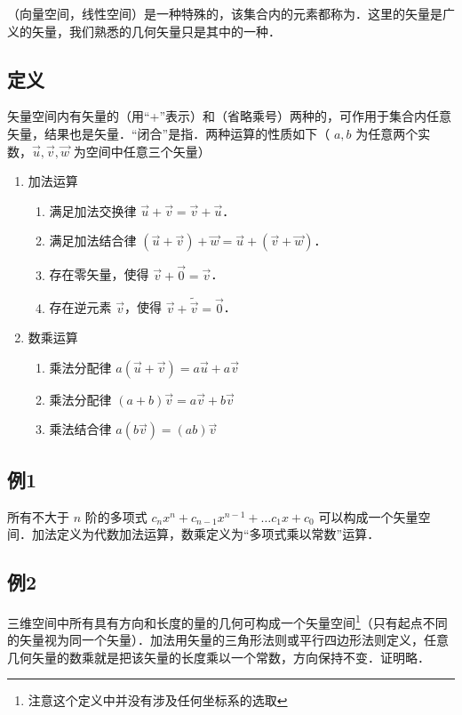 
（向量空间，线性空间）是一种特殊的，该集合内的元素都称为．这里的矢量是广义的矢量，我们熟悉的几何矢量只是其中的一种．

\subsection{定义}
矢量空间内有矢量的（用“+”表示）和（省略乘号）两种的，可作用于集合内任意矢量，结果也是矢量．“闭合”是指．两种运算的性质如下（ $a,b$ 为任意两个实数，$\vec u,\vec v,\vec w$ 为空间中任意三个矢量）
\begin{enumerate}
\item 加法运算
\begin{enumerate}
\item 满足加法交换律 $\vec u + \vec v = \vec v + \vec u$．
\item 满足加法结合律 $(\vec u + \vec v) + \vec w = \vec u + (\vec v + \vec w)$．
\item 存在零矢量，使得 $\vec v + \vec 0 = \vec v$．
\item 存在逆元素 $\vec v$，使得 $\vec v + \tilde{\vec v} = \vec 0$．
\end{enumerate}

\item 数乘运算
\begin{enumerate}
\item 乘法分配律 $a(\vec u + \vec v) = a\vec u + a\vec v$ 
\item 乘法分配律 $(a + b)\vec v = a\vec v + b\vec v$
\item 乘法结合律 $a (b \vec v) = (ab) \vec v$
\end{enumerate}
\end{enumerate}

\subsection{例1}
所有不大于 $n$ 阶的多项式 ${c_n}{x^n}+{c_{n - 1}}{x^{n - 1}}+\dots{c_1}x　+{c_0}$ 可以构成一个矢量空间．加法定义为代数加法运算，数乘定义为“多项式乘以常数”运算． 

\subsection{例2}
三维空间中所有具有方向和长度的量的几何可构成一个矢量空间\footnote{注意这个定义中并没有涉及任何坐标系的选取}（只有起点不同的矢量视为同一个矢量）．加法用矢量的三角形法则或平行四边形法则定义，任意几何矢量的数乘就是把该矢量的长度乘以一个常数，方向保持不变．证明略．



